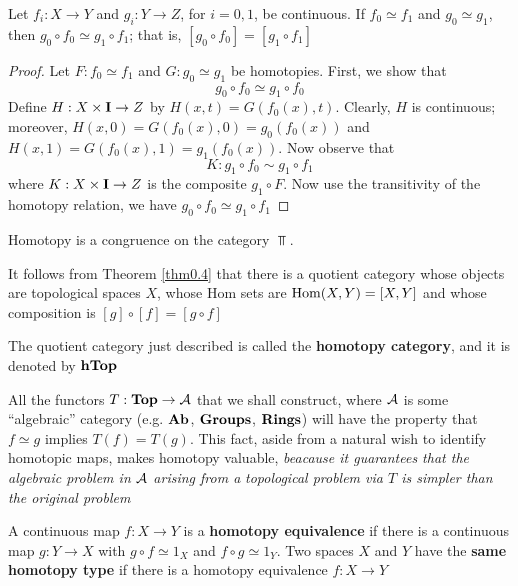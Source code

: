 \documentclass[11pt]{article}
\begin{document}
\begin{theorem}[]
Let \(f_i:X\to Y\) and \(g_i:Y\to Z\), for \(i=0,1\), be continuous. If \(f_0\simeq f_1\) and \(g_0\simeq g_1\),
then \(g_0\circ f_0\simeq g_1\circ f_1\); that is, \([g_0\circ f_0]=[g_1\circ f_1]\)
\end{theorem}

\begin{proof}
Let \(F:f_0\simeq f_1\) and \(G:g_0\simeq g_1\) be homotopies. First, we show that
\begin{equation*}
g_0\circ f_0\simeq g_1\circ f_0
\end{equation*}
Define \(H:X\times\operatorname{\textbf{I}}\to Z\) by \(H(x,t)=G(f_0(x),t)\). Clearly, \(H\) is continuous;
moreover, \(H(x,0)=G(f_0(x),0)=g_0(f_0(x))\) and \(H(x,1)=G(f_0(x),1)=g_1(f_0(x))\). Now observe
that
\begin{equation*}
K:g_1\circ f_0\sim g_1\circ f_1
\end{equation*}
where \(K:X\times\operatorname{\textbf{I}}\to Z\) is the composite \(g_1\circ F\). Now use the transitivity of the homotopy relation,
we have \(g_0\circ f_0\simeq g_1\circ f_1\)
\end{proof}

\begin{corollary}[]
Homotopy is a congruence on the category \(\Top\).
\end{corollary}

It follows from Theorem \ref{thm0.4} that there is a quotient category whose objects are
topological spaces \(X\), whose Hom sets are \(\operatorname{Hom}(X,Y)=[X,Y]\) and whose composition
is \([g]\circ[f]=[g\circ f]\)

\begin{definition}[]
The quotient category just described is called the \textbf{homotopy category}, and it is denoted by
\(\operatorname{\textbf{hTop}}\)
\end{definition}

All the functors \(T:\operatorname{\textbf{Top}}\to\mathcal{A}\) that we shall construct, where \(\mathcal{A}\) is some ``algebraic'' category
(e.g. \(\operatorname{\textbf{Ab}}\), \(\operatorname{\textbf{Groups}}\), \(\operatorname{\textbf{Rings}}\)) will have the property that \(f\simeq g\)
implies \(T(f)=T(g)\). This fact, aside from a natural wish to identify homotopic maps, makes
homotopy valuable, \emph{beacause it guarantees that the algebraic problem in \(\mathcal{A}\) arising from a}
\emph{topological problem via \(T\) is simpler than the original problem}

\begin{definition}[]
A continuous map \(f:X\to Y\) is a \textbf{homotopy equivalence} if there is a continuous map \(g:Y\to X\)
with \(g\circ f\simeq 1_X\) and \(f\circ g\simeq 1_Y\). Two spaces \(X\) and \(Y\) have the \textbf{same homotopy type} if
there is a homotopy equivalence \(f:X\to Y\)
\end{definition}
\end{document}

